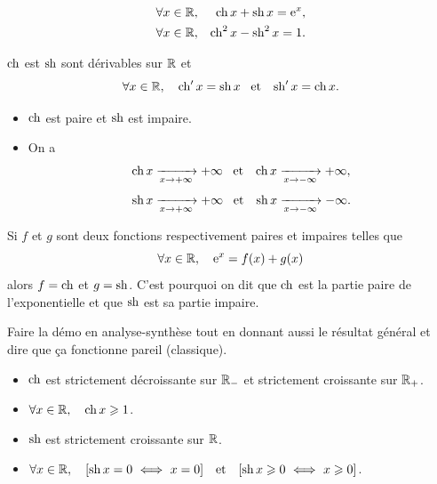 \documentclass{magnolia}
\begin{document}
\begin{proposition}[utile=-3]
\begin{eqnarray*}
\forall x\in\mathbb{R}, & & \operatorname{ch} x+\operatorname{sh} x={\rm e}^x,\\
\forall x\in\mathbb{R}, & & \operatorname{ch}^2 x-\operatorname{sh}^2 x=1.  
\end{eqnarray*}
\end{proposition}


\begin{proposition}[utile=-3]
$\operatorname{ch}$ est $\operatorname{sh}$ sont dérivables sur $\mathbb{R}$ et
\[\forall x\in\mathbb{R} ,\quad \operatorname{ch}'x=\operatorname{sh} x \quad\!\text{et}\quad\! \operatorname{sh}'x=\operatorname{ch} x.\]
\end{proposition}

\begin{proposition}[utile=-3]
\begin{itemize}
\item $\operatorname{ch}$ est paire et $\operatorname{sh}$ est impaire.
\item On a
  \[\operatorname{ch} x \xrightarrow[x\rightarrow +\infty]{} +\infty \quad\!\text{et}\quad\!
    \operatorname{ch} x \xrightarrow[x\rightarrow -\infty]{} +\infty,\]
  \[\operatorname{sh} x \xrightarrow[x\rightarrow +\infty]{} +\infty \quad\!\text{et}\quad\!
    \operatorname{sh} x \xrightarrow[x\rightarrow -\infty]{} -\infty.\]
\end{itemize}
\end{proposition}

\begin{remarqueUnique}
\remarque Si $f$ et $g$ sont deux fonctions respectivement paires et impaires
  telles que
  \[\forall x\in\mathbb{R} ,\quad {\rm e}^x=f(x)+g(x)\]
  alors $f=\operatorname{ch}$ et $g=\operatorname{sh}$. C'est pourquoi on dit que $\operatorname{ch}$ est la
  partie paire de l'exponentielle et que $\operatorname{sh}$ est sa partie impaire.
\end{remarqueUnique}
\begin{sol}
Faire la démo en analyse-synthèse tout en donnant aussi le résultat général et dire que ça fonctionne pareil (classique).
\end{sol}

\begin{proposition}[utile=-3]
\begin{itemize}
\item $\operatorname{ch}$ est strictement décroissante sur $\mathbb{R}_-$ et strictement croissante sur
  $\mathbb{R}_+$.
\item $\forall x\in\mathbb{R} ,\quad \operatorname{ch} x\geqslant 1$.
\item $\operatorname{sh}$ est strictement croissante sur $\mathbb{R}$.
\item $\forall x\in\R \qsep \cro{\sh x=0 \ \ssi\  x=0} \et
  \cro{\sh x\geq 0 \ \ssi\  x\geq 0}$.
\end{itemize}
\end{proposition}
\end{document}

